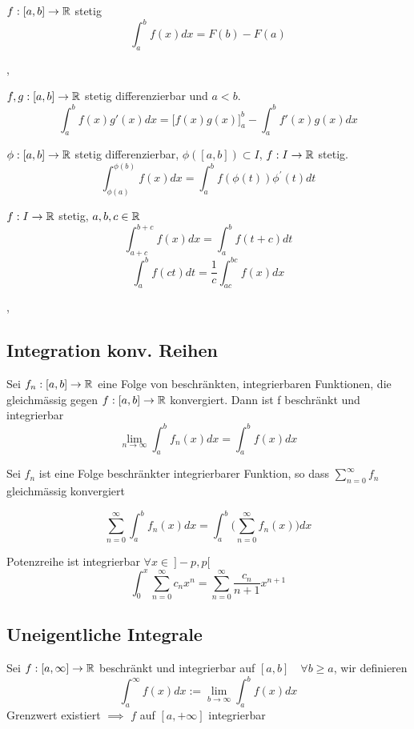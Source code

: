 \Satz[5.4.3 Fundamentalsatz] $f : [a,b] \rightarrow \mathbb{R}$ stetig
\[ \int_a^b f(x) dx = F(b) - F(a) \]

\sep

 ${f, g : [a,b] \rightarrow \mathbb{R}}$ stetig differenzierbar und $a < b$.
\[ \int_{a}^{b} f(x) g'(x) dx = \Big[f(x)g(x)\Big]_a^b - \int_{a}^{b} f'(x) g(x) dx \]

\Satz[5.4.6 Substitution] $ \phi : [a,b] \rightarrow \mathbb{R}$ stetig differenzierbar, $\phi([a,b]) \subset I $, $f : I \rightarrow \mathbb{R}$ stetig.
\[ \int_{\phi(a)}^{\phi(b)} f(x) dx=\int_{a}^{b} f(\phi(t)) \phi^{\prime}(t) dt \]

\Korollar[5.4.8] $f : I \rightarrow \mathbb{R}$ stetig, $a,b,c \in \mathbb{R}$ 
\[ \int_{a + c}^{b + c} f(x) dx = \int_{a}^{b} f(t + c) dt \]
\[ \int_{a}^{b} f(ct) dt = \frac{1}{c} \int_{ac}^{bc} f(x) dx \]

\sep

\subsection{Integration konv. Reihen}

\Satz[5.5.1] Sei ${f_n : [a,b] \rightarrow \mathbb{R}}$ eine Folge von beschränkten, integrierbaren Funktionen, die gleichmässig gegen $f: [a,b] \rightarrow \mathbb{R}$ konvergiert. Dann ist f beschränkt und integrierbar
\[ \lim\limits_{n \rightarrow \infty} \int_a^b f_n(x) dx = \int_a^b f(x) dx \]

\Korollar[5.5.2] Sei $f_n$ ist eine Folge beschränkter integrierbarer Funktion, so dass $\sum_{n=0}^\infty f_n$ gleichmässig konvergiert 

\[ \sum_{n=0}^\infty \int_a^b f_n(x) dx= \int_a^b \Bigg( \sum_{n=0}^\infty f_n(x) \Bigg ) dx \] %

\Korollar[5.5.3] Potenzreihe ist integrierbar $\forall x \in \ ]-p, p[$
\[\int_0^x \sum_{n= 0}^\infty c_n x^n =  \sum_{n= 0}^\infty \frac{c_n}{n + 1} x^{n+1} \]

\subsection{Uneigentliche Integrale}

\Def[5.8.1] Sei $f:[a,\infty] \rightarrow \mathbb{R}$ beschränkt und integrierbar auf $[a,b] \quad \forall b \geq a$, wir definieren
\[\int_a^\infty f(x) dx := \lim_{b \rightarrow \infty} \int_a^b f(x) dx\]
Grenzwert existiert $\implies$  $f$ auf $[a, + \infty]$ integrierbar \\

